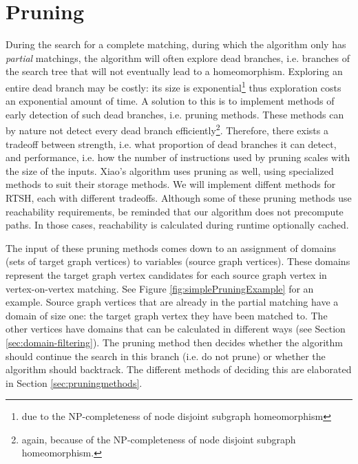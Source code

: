 \chapter{Pruning}
\label{chapter:pruning}

During the search for a complete matching, during which the algorithm only has \textit{partial} matchings, the algorithm will often explore dead branches, i.e. branches of the search tree that will not eventually lead to a homeomorphism. Exploring an entire dead branch may be costly: its size is exponential\footnote{due to the NP-completeness of node disjoint subgraph homeomorphism} thus exploration costs an exponential amount of time. A solution to this is to implement methods of early detection of such dead branches, i.e. pruning methods. These methods can by nature not detect every dead branch efficiently\footnote{again, because of the NP-completeness of node disjoint subgraph homeomorphism.}. Therefore, there exists a tradeoff between strength, i.e. what proportion of dead branches it can detect, and performance, i.e. how the number of instructions used by pruning scales with the size of the inputs. Xiao's algorithm uses pruning as well, using specialized methods to suit their storage methods. We will implement diffent methods for RTSH, each with different tradeoffs. Although some of these pruning methods use reachability requirements, be reminded that our algorithm does not precompute paths. In those cases, reachability is calculated during runtime optionally cached.

The input of these pruning methods comes down to an assignment of domains (sets of target graph vertices) to variables (source graph vertices). These domains represent the target graph vertex candidates for each source graph vertex in vertex-on-vertex matching. See Figure \ref{fig:simplePruningExample} for an example. Source graph vertices that are already in the partial matching have a domain of size one: the target graph vertex they have been matched to. The other vertices have domains that can be calculated in different ways (see Section \ref{sec:domain-filtering}). The pruning method then decides whether the algorithm should continue the search in this branch (i.e. do not prune) or whether the algorithm should backtrack. The different methods of deciding this are elaborated in Section \ref{sec:pruningmethods}.

